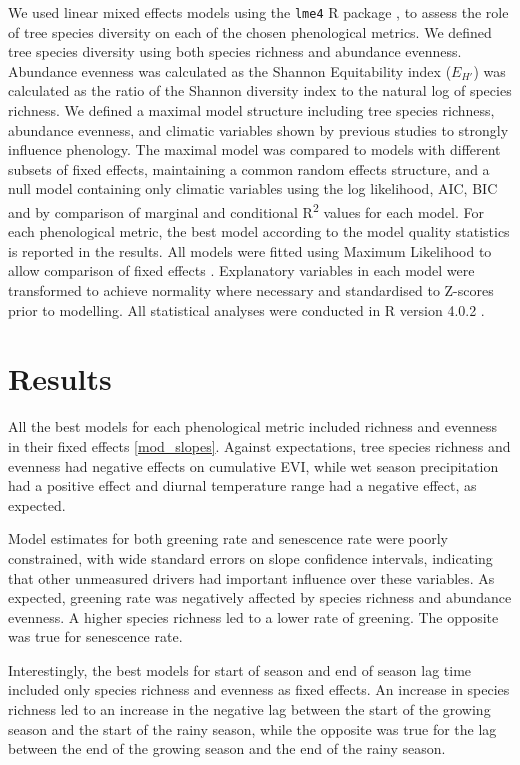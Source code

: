 \documentclass[11pt,a4paper]{article}
\begin{document}
We used linear mixed effects models using the \texttt{lme4} R package \citep{lme4}, to assess the role of tree species diversity on each of the chosen phenological metrics. We defined tree species diversity using both species richness and abundance evenness. Abundance evenness was calculated as the Shannon Equitability index ($E_{H'}$) \citep{Smith1996} was calculated as the ratio of the Shannon diversity index to the natural log of species richness. We defined a maximal model structure including tree species richness, abundance evenness, and climatic variables shown by previous studies to strongly influence phenology. The maximal model was compared to models with different subsets of fixed effects, maintaining a common random effects structure, and a null model containing only climatic variables using the log likelihood, AIC, BIC and by comparison of marginal and conditional R\textsuperscript{2} values for each model. For each phenological metric, the best model according to the model quality statistics is reported in the results. All models were fitted using Maximum Likelihood to allow comparison of fixed effects \citep{}. Explanatory variables in each model were transformed to achieve normality where necessary and standardised to Z-scores prior to modelling. All statistical analyses were conducted in R version 4.0.2 \citep{R2020}.

\section{Results}

All the best models for each phenological metric included richness and evenness in their fixed effects \autoref{mod_slopes}. Against expectations, tree species richness and evenness had negative effects on cumulative EVI, while wet season precipitation had a positive effect and diurnal temperature range had a negative effect, as expected. 

Model estimates for both greening rate and senescence rate were poorly constrained, with wide standard errors on slope confidence intervals, indicating that other unmeasured drivers had important influence over these variables.  
As expected, greening rate was negatively affected by species richness and abundance evenness. A higher species richness led to a lower rate of greening. The opposite was true for senescence rate. 

Interestingly, the best models for start of season and end of season lag time included only species richness and evenness as fixed effects. An increase in species richness led to an increase in the negative lag between the start of the growing season and the start of the rainy season, while the opposite was true for the lag between the end of the growing season and the end of the rainy season. 
\end{document}
